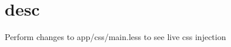 \chapter{desc}
\hypertarget{md__d_1_2_g_i_t_2_food_link_2foodlink_8client_2node__modules_2bs-recipes_2recipes_2middleware_8css_8injection_2desc}{}\label{md__d_1_2_g_i_t_2_food_link_2foodlink_8client_2node__modules_2bs-recipes_2recipes_2middleware_8css_8injection_2desc}

\begin{DoxyItemize}
\item Perform changes to {\ttfamily app/css/main.\+less} to see live css injection 
\end{DoxyItemize}